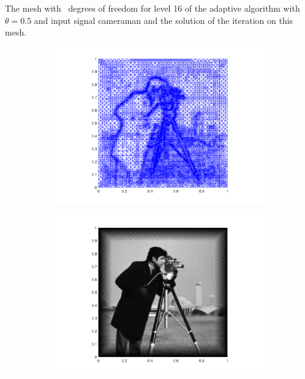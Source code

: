 \begin{frame}
  The mesh with \nrDof\ degrees of freedom for level 16 of the adaptive
  algorithm with $\theta = 0.5$ and input signal cameraman and the solution of
  the iteration on this mesh.

  \begin{figure}[!ht]
    \centering
    \begin{subfigure}{.6\linewidth}
      \includegraphics[trim = 100 30 20 20, clip,width=\linewidth]
        {pictures/experiments/refIndTriang/cam/lvl16/triangulation.png}
    \end{subfigure}
    \hspace{-1.2cm}
    \begin{subfigure}{.4\linewidth}
      \includegraphics[trim = 80 30 80 20, clip, width=\linewidth]
        {pictures/experiments/refIndTriang/cam/lvl16/solutionGrayscale.png}
    \end{subfigure}
  \end{figure}
\end{frame}

